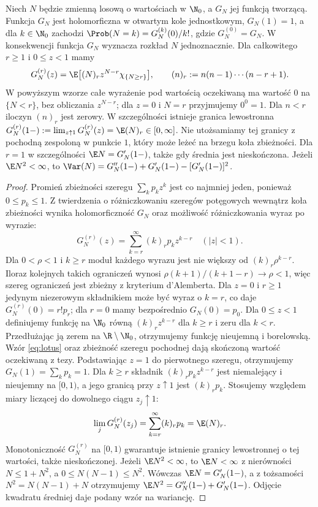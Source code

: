 \begin{twierdzenie}
Niech $N$ będzie zmienną losową o wartościach w $\N_0$,
a $G_N$ jej funkcją tworzącą. Funkcja $G_N$ jest holomorficzna
w otwartym kole jednostkowym, $G_N(1)=1$, a dla $k\in\N_0$
zachodzi $\Prob(N=k)=G_N^{(k)}(0)/k!$, gdzie
$G_N^{(0)}=G_N$. W konsekwencji funkcja $G_N$ wyznacza
rozkład $N$ jednoznacznie.
Dla całkowitego $r\geq1$ i $0\leq z<1$ mamy
\[
G_N^{(r)}(z)=\E\bigl[(N)_r z^{N-r}\chi_{\{N\geq r\}}\bigr],
\qquad (n)_r:=n(n-1)\cdots(n-r+1).
\]
W powyższym wzorze całe wyrażenie pod wartością oczekiwaną
ma wartość $0$ na $\{N<r\}$, bez obliczania $z^{N-r}$;
dla $z=0$ i $N=r$ przyjmujemy $0^0=1$.
Dla $n<r$ iloczyn $(n)_r$ jest zerowy.
W szczególności istnieje granica lewostronna
$G_N^{(r)}(1-):=\lim_{z\uparrow1}G_N^{(r)}(z)
=\E(N)_r\in[0,\infty]$.
Nie utożsamiamy tej granicy z pochodną zespoloną w punkcie
$1$, który może leżeć na brzegu koła zbieżności.
Dla $r=1$ w szczególności $\E N=G_N'(1-)$,
także gdy średnia jest nieskończona.
Jeżeli $\E N^2<\infty$, to
$\Var(N)=G_N''(1-)+G_N'(1-)-[G_N'(1-)]^2$.
\end{twierdzenie}
\begin{proof}
Promień zbieżności szeregu $\sum_k p_kz^k$ jest co
najmniej jeden, ponieważ $0\leq p_k\leq1$.
Z twierdzenia o różniczkowaniu szeregów potęgowych
wewnątrz koła zbieżności wynika holomorficzność $G_N$
oraz możliwość różniczkowania wyraz po wyrazie:
\[
G_N^{(r)}(z)=\sum_{k=r}^\infty (k)_r p_kz^{k-r}
\quad (|z|<1).
\]
Dla $0<\rho<1$ i $k\geq r$ moduł każdego wyrazu
jest nie większy od $(k)_r\rho^{k-r}$.
Iloraz kolejnych takich ograniczeń wynosi
$\rho(k+1)/(k+1-r)\to\rho<1$, więc szereg ograniczeń
jest zbieżny z kryterium d'Alemberta.
Dla $z=0$ i $r\geq1$ jedynym niezerowym składnikiem
może być wyraz o $k=r$, co daje $G_N^{(r)}(0)=r!p_r$;
dla $r=0$ mamy bezpośrednio $G_N(0)=p_0$.
Dla $0\leq z<1$ definiujemy funkcję na $\N_0$ równą
$(k)_rz^{k-r}$ dla $k\geq r$ i zeru dla $k<r$.
Przedłużając ją zerem na $\R\setminus\N_0$, otrzymujemy
funkcję nieujemną i borelowską. Wzór \eqref{eq:lotus}
oraz zbieżność szeregu pochodnej dają skończoną
wartość oczekiwaną z tezy.
Podstawiając $z=1$ do pierwotnego szeregu, otrzymujemy
$G_N(1)=\sum_kp_k=1$.
Dla $k\geq r$ składnik $(k)_rp_kz^{k-r}$ jest
niemalejący i nieujemny na $[0,1)$, a jego granicą
przy $z\uparrow1$ jest $(k)_rp_k$.
Stosujemy 
względem miary liczącej do dowolnego ciągu $z_j\uparrow1$:
\[
\lim_j G_N^{(r)}(z_j)=
\sum_{k=r}^\infty(k)_rp_k=\E(N)_r.
\]
Monotoniczność $G_N^{(r)}$ na $[0,1)$ gwarantuje istnienie
granicy lewostronnej o tej wartości, także nieskończonej.
Jeżeli $\E N^2<\infty$, to $\E N<\infty$ z nierówności
$N\leq1+N^2$, a $0\leq N(N-1)\leq N^2$.
Wówczas $\E N=G_N'(1-)$, a z tożsamości
$N^2=N(N-1)+N$ otrzymujemy
$\E N^2=G_N''(1-)+G_N'(1-)$.
Odjęcie kwadratu średniej daje podany wzór na wariancję.
\end{proof}

